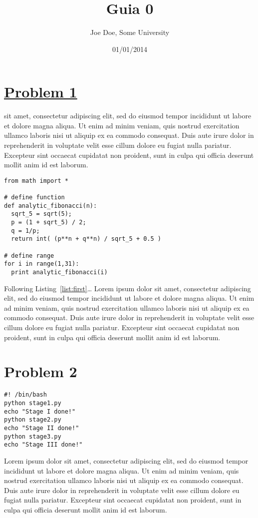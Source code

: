 \documentclass[a4paper,11pt]{article}
\makeatletter
\theoremstyle{mytheor}
\renewcommand{\maketitle}{
\colorbox{gray!20}{\framebox[\linewidth]{ \huge \textsc{\@title} } }

}
\makeatother
\begin{document}
\title{Guia 0}

\author{Joe Doe, Some University}

\date{01/01/2014}

\maketitle

\section*{\underline{Problem 1}}




sit amet, consectetur adipiscing elit, sed do eiusmod tempor incididunt ut labore et dolore magna aliqua. Ut enim ad minim veniam, quis nostrud exercitation ullamco laboris nisi ut aliquip ex ea commodo consequat. Duis aute irure dolor in reprehenderit in voluptate velit esse cillum dolore eu fugiat nulla pariatur. Excepteur sint occaecat cupidatat non proident, sunt in culpa qui officia deserunt mollit anim id est laborum.

\begin{lstlisting}[label={list:first},caption=Sample Python code -- Fibonacci sequence calculated analytically.]
from math import *

# define function 
def analytic_fibonacci(n):
  sqrt_5 = sqrt(5);
  p = (1 + sqrt_5) / 2;
  q = 1/p;
  return int( (p**n + q**n) / sqrt_5 + 0.5 )
 
# define range
for i in range(1,31):
  print analytic_fibonacci(i)
\end{lstlisting}

Following Listing~\ref{list:first}\ldots{} 
Lorem ipsum dolor sit amet, consectetur adipiscing elit, sed do eiusmod tempor incididunt ut labore et dolore magna aliqua. Ut enim ad minim veniam, quis nostrud exercitation ullamco laboris nisi ut aliquip ex ea commodo consequat. Duis aute irure dolor in reprehenderit in voluptate velit esse cillum dolore eu fugiat nulla pariatur. Excepteur sint occaecat cupidatat non proident, sunt in culpa qui officia deserunt mollit anim id est laborum.

\section*{Problem 2}

\begin{lstlisting}[label={list:second},caption=Sample Bash code.]
#! /bin/bash
python stage1.py
echo "Stage I done!"
python stage2.py
echo "Stage II done!"
python stage3.py
echo "Stage III done!"
\end{lstlisting}

Lorem ipsum dolor sit amet, consectetur adipiscing elit, sed do eiusmod tempor incididunt ut labore et dolore magna aliqua. Ut enim ad minim veniam, quis nostrud exercitation ullamco laboris nisi ut aliquip ex ea commodo consequat. Duis aute irure dolor in reprehenderit in voluptate velit esse cillum dolore eu fugiat nulla pariatur. Excepteur sint occaecat cupidatat non proident, sunt in culpa qui officia deserunt mollit anim id est laborum.
\end{document}

